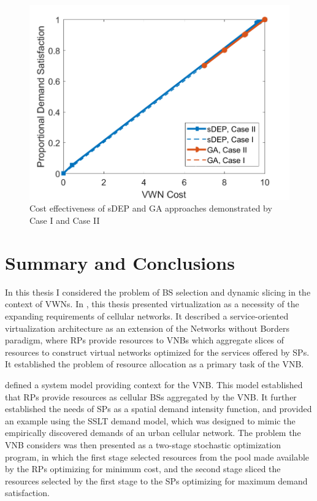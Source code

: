 \documentclass[12pt,dvipsnames]{report}
\begin{document}
\begin{figure}[htp]
	\centering
	\includegraphics[height=0.4\textheight]{Figures/CaseII_ComparisonCostvSat_CaseICaseII}
	\caption{Cost effectiveness of sDEP and GA approaches demonstrated by Case I and Case II}
	\label{fig:CaseII_ComparisonCostvSat_CaseICaseII}
\end{figure}

\fi

\iftrue
\pagebreak
\chapter{Summary and Conclusions} \label{ch:conc}

In this thesis I considered the problem of BS selection and dynamic slicing in the context of VWNs.  In , this thesis presented virtualization as a necessity of the expanding requirements of cellular networks.  It described a service-oriented virtualization architecture as an extension of the Networks without Borders paradigm, where RPs provide resources to VNBs which aggregate slices of resources to construct virtual networks optimized for the services offered by SPs.  It established the problem of resource allocation as a primary task of the VNB.

 defined a system model providing context for the VNB.  This model established that RPs provide resources as cellular BSs aggregated by the VNB.  It further established the needs of SPs as a spatial demand intensity function, and provided an example using the SSLT demand model, which was designed to mimic the empirically discovered demands of an urban cellular network.  The problem the VNB considers was then presented as a two-stage stochastic optimization program, in which the first stage selected resources from the pool made available by the RPs optimizing for minimum cost, and the second stage sliced the resources selected by the first stage to the SPs optimizing for maximum demand satisfaction.
\end{document}
